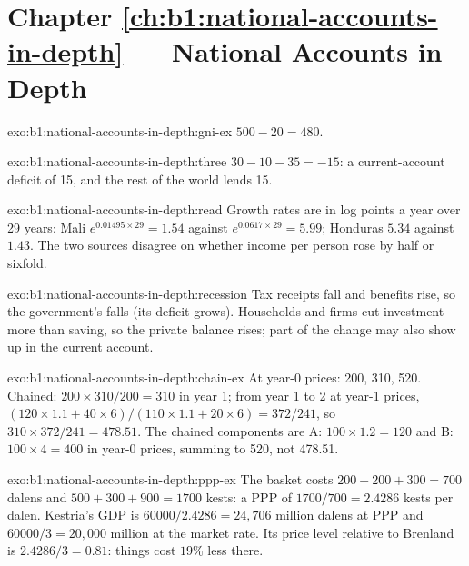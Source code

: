 \section*{Chapter \ref{ch:b1:national-accounts-in-depth} --- National Accounts in Depth}

\begin{solution}{exo:b1:national-accounts-in-depth:gni-ex}
$500 - 20 = 480$.
\end{solution}

\begin{solution}{exo:b1:national-accounts-in-depth:three}
$30 - 10 - 35 = -15$: a current-account deficit of 15, and the rest of the world
lends 15.
\end{solution}

\begin{solution}{exo:b1:national-accounts-in-depth:read}
Growth rates are in log points a year over 29 years: Mali
$e^{0.01495 \times 29} = 1.54$ against $e^{0.0617 \times 29} = 5.99$; Honduras $5.34$ against $1.43$. The two
sources disagree on whether income per person rose by half or sixfold.
\end{solution}

\begin{solution}{exo:b1:national-accounts-in-depth:recession}
Tax receipts fall and benefits rise, so the government's  falls
(its deficit grows). Households and firms cut investment more than saving,
so the private balance rises; part of the change may also show up in the
current account.
\end{solution}

\begin{solution}{exo:b1:national-accounts-in-depth:chain-ex}
At year-0 prices: 200, 310, 520. Chained: $200 \times 310/200 = 310$ in year 1; from year 1
to 2 at year-1 prices, $(120 \times 1.1 + 40 \times 6)/(110 \times 1.1 + 20 \times 6) = 372/241$, so $310 \times 372/241 = 478.51$.
The chained components are A: $100 \times 1.2 = 120$ and B: $100 \times 4 = 400$ in year-0 prices,
summing to 520, not 478.51.
\end{solution}

\begin{solution}{exo:b1:national-accounts-in-depth:ppp-ex}
The basket costs $200 + 200 + 300 = 700$ dalens and $500 + 300 + 900 = 1700$ kests: a PPP of
$1700/700 = 2.4286$ kests per dalen. Kestria's GDP is $60000/2.4286 = 24{,}706$ million
dalens at PPP and $60000/3 = 20{,}000$ million at the market rate. Its price level
relative to Brenland is $2.4286/3 = 0.81$: things cost $19\%$ less there.
\end{solution}

